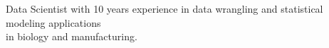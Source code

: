 \documentclass[]{deedy-resume-openfont}
\begin{document}
%
%
\texticon
\lastupdated

%
%

{Data Scientist with 10 years experience in data wrangling and statistical modeling applications\\in biology and manufacturing.}
%
%
\end{document}
